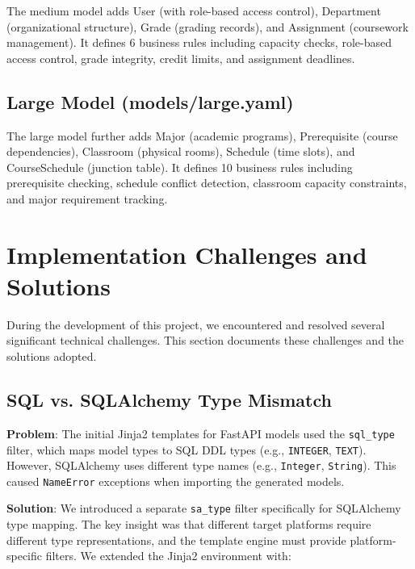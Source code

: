 \documentclass[11pt,a4paper]{article}
\begin{document}
The medium model adds User (with role-based access control), Department (organizational structure), Grade (grading records), and Assignment (coursework management). It defines 6 business rules including capacity checks, role-based access control, grade integrity, credit limits, and assignment deadlines.

\subsection{Large Model (models/large.yaml)}

The large model further adds Major (academic programs), Prerequisite (course dependencies), Classroom (physical rooms), Schedule (time slots), and CourseSchedule (junction table). It defines 10 business rules including prerequisite checking, schedule conflict detection, classroom capacity constraints, and major requirement tracking.

\newpage
\section{Implementation Challenges and Solutions}
\label{sec:challenges}

During the development of this project, we encountered and resolved several significant technical challenges. This section documents these challenges and the solutions adopted.

\subsection{SQL vs. SQLAlchemy Type Mismatch}

\textbf{Problem}: The initial Jinja2 templates for FastAPI models used the {\lstinline|sql_type|} filter, which maps model types to SQL DDL types (e.g., \texttt{INTEGER}, \texttt{TEXT}). However, SQLAlchemy uses different type names (e.g., \texttt{Integer}, \texttt{String}). This caused {\lstinline|NameError|} exceptions when importing the generated models.

\textbf{Solution}: We introduced a separate {\lstinline|sa_type|} filter specifically for SQLAlchemy type mapping. The key insight was that different target platforms require different type representations, and the template engine must provide platform-specific filters. We extended the Jinja2 environment with:
\end{document}
